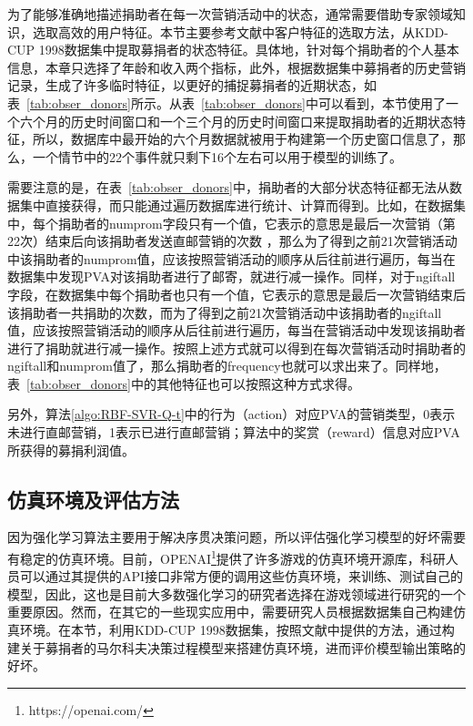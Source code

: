 为了能够准确地描述捐助者在每一次营销活动中的状态，通常需要借助专家领域知识，选取高效的用户特征。本节主要参考文献\citep{tkachenko2015autonomous, pednault2002sequential}中客户特征的选取方法，从KDD-CUP 1998数据集中提取募捐者的状态特征。具体地，针对每个捐助者的个人基本信息，本章只选择了年龄和收入两个指标，此外，根据数据集中募捐者的历史营销记录，生成了许多临时特征，以更好的捕捉募捐者的近期状态，如表~\ref{tab:obser_donors}所示。从表~\ref{tab:obser_donors}中可以看到，本节使用了一个六个月的历史时间窗口和一个三个月的历史时间窗口来提取捐助者的近期状态特征，所以，数据库中最开始的六个月数据就被用于构建第一个历史窗口信息了，那么，一个情节中的22个事件就只剩下16个左右可以用于模型的训练了。

需要注意的是，在表~\ref{tab:obser_donors}中，捐助者的大部分状态特征都无法从数据集中直接获得，而只能通过遍历数据库进行统计、计算而得到。比如，在数据集中，每个捐助者的numprom字段只有一个值，它表示的意思是最后一次营销（第22次）结束后向该捐助者发送直邮营销的次数 ，那么为了得到之前21次营销活动中该捐助者的numprom值，应该按照营销活动的顺序从后往前进行遍历，每当在数据集中发现PVA对该捐助者进行了邮寄，就进行减一操作。同样，对于ngiftall字段，在数据集中每个捐助者也只有一个值，它表示的意思是最后一次营销结束后该捐助者一共捐助的次数，而为了得到之前21次营销活动中该捐助者的ngiftall值，应该按照营销活动的顺序从后往前进行遍历，每当在营销活动中发现该捐助者进行了捐助就进行减一操作。按照上述方式就可以得到在每次营销活动时捐助者的ngiftall和numprom值了，那么捐助者的frequency也就可以求出来了。同样地，表~\ref{tab:obser_donors}中的其他特征也可以按照这种方式求得。

另外，算法\ref{algo:RBF-SVR-Q-t}中的行为（action）对应PVA的营销类型，0表示未进行直邮营销，1表示已进行直邮营销；算法中的奖赏（reward）信息对应PVA所获得的募捐利润值。

\subsection{仿真环境及评估方法}
因为强化学习算法主要用于解决序贯决策问题，所以评估强化学习模型的好坏需要有稳定的仿真环境。目前，OPENAI\footnote{https://openai.com/}提供了许多游戏的仿真环境开源库，科研人员可以通过其提供的API接口非常方便的调用这些仿真环境，来训练、测试自己的模型，因此，这也是目前大多数强化学习的研究者选择在游戏领域进行研究的一个重要原因。然而，在其它的一些现实应用中，需要研究人员根据数据集自己构建仿真环境。在本节，利用KDD-CUP 1998数据集，按照文献\citep{pednault2002sequential}中提供的方法，通过构建关于募捐者的马尔科夫决策过程模型来搭建仿真环境，进而评价模型输出策略的好坏。

